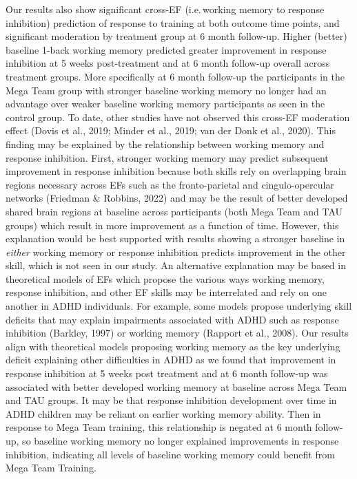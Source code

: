 \documentclass[
  letterpaper,
]{ut-thesis}
\begin{document}
Our results also show significant cross-EF (i.e.\,working memory to
response inhibition) prediction of response to training at both outcome
time points, and significant moderation by treatment group at 6 month
follow-up. Higher (better) baseline 1-back working memory predicted
greater improvement in response inhibition at 5 weeks post-treatment and
at 6 month follow-up overall across treatment groups. More specifically
at 6 month follow-up the participants in the Mega Team group with
stronger baseline working memory no longer had an advantage over weaker
baseline working memory participants as seen in the control group. To
date, other studies have not observed this cross-EF moderation effect
(Dovis et al., 2019; Minder et al., 2019; van der Donk et al., 2020).
This finding may be explained by the relationship between working memory
and response inhibition. First, stronger working memory may predict
subsequent improvement in response inhibition because both skills rely
on overlapping brain regions necessary across EFs such as the
fronto-parietal and cingulo-opercular networks (Friedman \& Robbins,
2022) and may be the result of better developed shared brain regions at
baseline across participants (both Mega Team and TAU groups) which
result in more improvement as a function of time. However, this
explanation would be best supported with results showing a stronger
baseline in \emph{either} working memory or response inhibition predicts
improvement in the other skill, which is not seen in our study. An
alternative explanation may be based in theoretical models of EFs which
propose the various ways working memory, response inhibition, and other
EF skills may be interrelated and rely on one another in ADHD
individuals. For example, some models propose underlying skill deficits
that may explain impairments associated with ADHD such as response
inhibition (Barkley, 1997) or working memory (Rapport et al., 2008). Our
results align with theoretical models proposing working memory as the
key underlying deficit explaining other difficulties in ADHD as we found
that improvement in response inhibition at 5 weeks post treatment and at
6 month follow-up was associated with better developed working memory at
baseline across Mega Team and TAU groups. It may be that response
inhibition development over time in ADHD children may be reliant on
earlier working memory ability. Then in response to Mega Team training,
this relationship is negated at 6 month follow-up, so baseline working
memory no longer explained improvements in response inhibition,
indicating all levels of baseline working memory could benefit from Mega
Team Training.
\end{document}

